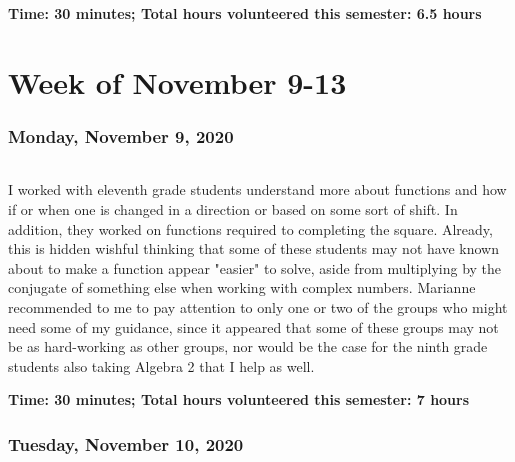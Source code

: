 \documentclass{article}
\begin{document}
\textbf{Time: 30 minutes; Total hours volunteered this semester: 6.5 hours}

\part{Week of November 9-13}
\section{Monday, November 9, 2020}

\paragraph{} I worked with eleventh grade students understand more about functions and how if or when one is changed in a direction or based on some sort of shift. In addition, they worked on functions required to completing the square. Already, this is hidden wishful thinking that some of these students may not have known about to make a function appear "easier" to solve, aside from multiplying by the conjugate of something else when working with complex numbers. Marianne recommended to me to pay attention to only one or two of the groups who might need some of my guidance, since it appeared that some of these groups may not be as hard-working as other groups, nor would be the case for the ninth grade students also taking Algebra 2 that I help as well. 



\textbf{Time: 30 minutes; Total hours volunteered this semester: 7 hours}

\section{Tuesday, November 10, 2020}
\end{document}
